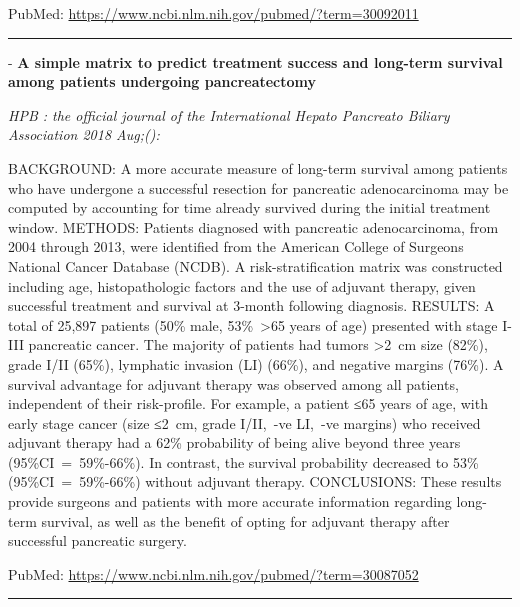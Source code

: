 \documentclass[]{article}
\begin{document}
PubMed: \url{https://www.ncbi.nlm.nih.gov/pubmed/?term=30092011}

{}

{}

\begin{center}\rule{0.5\linewidth}{\linethickness}\end{center}

 - \textbf{A simple matrix to predict treatment success and long-term
survival among patients undergoing pancreatectomy}

\emph{HPB : the official journal of the International Hepato Pancreato
Biliary Association 2018 Aug;():}

BACKGROUND: A more accurate measure of long-term survival among patients
who have undergone a successful resection for pancreatic adenocarcinoma
may be computed by accounting for time already survived during the
initial treatment window. METHODS: Patients diagnosed with pancreatic
adenocarcinoma, from 2004 through 2013, were identified from the
American College of Surgeons National Cancer Database (NCDB). A
risk-stratification matrix was constructed including age,
histopathologic factors and the use of adjuvant therapy, given
successful treatment and survival at 3-month following diagnosis.
RESULTS: A total of 25,897 patients (50\% male, 53\%~\textgreater{}65
years of age) presented with stage I-III pancreatic cancer. The majority
of patients had tumors \textgreater{}2~cm size (82\%), grade I/II
(65\%), lymphatic invasion (LI) (66\%), and negative margins (76\%). A
survival advantage for adjuvant therapy was observed among all patients,
independent of their risk-profile. For example, a patient ≤65 years of
age, with early stage cancer (size ≤2~cm, grade I/II,~-ve LI,~-ve
margins) who received adjuvant therapy had a 62\% probability of being
alive beyond three years (95\%CI~=~59\%-66\%). In contrast, the survival
probability decreased to 53\% (95\%CI~=~59\%-66\%) without adjuvant
therapy. CONCLUSIONS: These results provide surgeons and patients with
more accurate information regarding long-term survival, as well as the
benefit of opting for adjuvant therapy after successful pancreatic
surgery.

PubMed: \url{https://www.ncbi.nlm.nih.gov/pubmed/?term=30087052}

{}

{}

\begin{center}\rule{0.5\linewidth}{\linethickness}\end{center}
\end{document}
